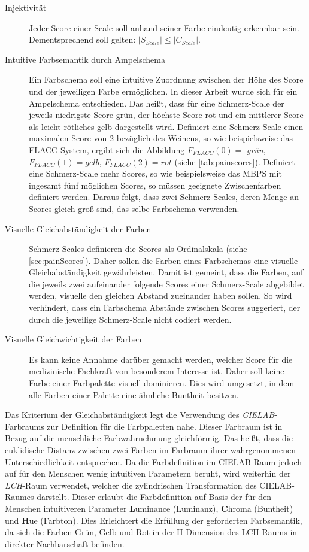 \begin{description}
\item[Injektivität] Jeder Score einer Scale soll anhand seiner Farbe eindeutig erkennbar sein. Dementsprechend soll gelten: $|S_{Scale}| \leq |C_{Scale}|$.
\item[Intuitive Farbsemantik durch Ampelschema] Ein Farbschema soll eine intuitive Zuordnung zwischen der Höhe des Score und der jeweiligen Farbe ermöglichen. In dieser Arbeit wurde sich für ein Ampelschema entschieden. Das heißt, dass für eine Schmerz-Scale der jeweils niedrigste Score \glqq grün\grqq{}, der höchste Score \glqq rot\grqq{} und ein \glqq mittlerer\grqq{} Score als \glqq leicht rötliches gelb\grqq{} dargestellt wird. Definiert eine Schmerz-Scale einen maximalen Score von 2 bezüglich des Weinens, so wie beispielsweise das FLACC-System, ergibt sich die Abbildung $F_{FLACC}(0) = $ \emph{grün}, $F_{FLACC}(1) = gelb$, $F_{FLACC}(2) = rot$ (siehe \autoref{tab:painscores}). Definiert eine Schmerz-Scale mehr Scores, so wie beispielsweise das MBPS mit ingesamt fünf möglichen Scores, so müssen geeignete Zwischenfarben definiert werden. Daraus folgt, dass zwei Schmerz-Scales, deren Menge an Scores gleich groß sind, das selbe Farbschema verwenden.
\item[Visuelle Gleichabständigkeit der Farben] Schmerz-Scales definieren die Scores als Ordinalskala (siehe \autoref{sec:painScores}). Daher sollen die Farben eines Farbschemas eine \glqq visuelle Gleichabständigkeit\grqq{} gewährleisten. Damit ist gemeint, dass die Farben, auf die jeweils zwei aufeinander folgende Scores einer Schmerz-Scale abgebildet werden, visuelle den gleichen Abstand zueinander haben sollen. So wird verhindert, dass ein Farbschema Abstände zwischen Scores suggeriert, der durch die jeweilige Schmerz-Scale nicht codiert werden. 
\item[Visuelle Gleichwichtigkeit der Farben] Es kann keine Annahme darüber gemacht werden, welcher Score für die medizinische Fachkraft von besonderem Interesse ist. Daher soll keine Farbe einer Farbpalette visuell dominieren. Dies wird umgesetzt, in dem alle Farben einer Palette eine ähnliche Buntheit besitzen.\cite{bigman}
\end{description}

Das Kriterium der Gleichabständigkeit legt die Verwendung des \emph{CIELAB}-Farbraums zur Definition für die Farbpaletten nahe. Dieser Farbraum ist in Bezug auf die menschliche Farbwahrnehmung \glqq gleichförmig\grqq. Das heißt, dass die euklidische Distanz zwischen zwei Farben im Farbraum ihrer wahrgenommenen Unterschiedlichkeit entsprechen. Da die Farbdefinition im CIELAB-Raum jedoch auf für den Menschen wenig intuitiven Parametern beruht, wird weiterhin der \emph{LCH}-Raum verwendet, welcher die zylindrischen Transformation des CIELAB-Raumes darstellt. Dieser erlaubt die Farbdefinition auf Basis der für den Menschen intuitiveren Parameter \textbf{L}uminance (Luminanz), \textbf{C}hroma (Buntheit) und \textbf{H}ue (Farbton). Dies Erleichtert die Erfüllung der geforderten Farbsemantik, da sich die Farben Grün, Gelb und Rot in der H-Dimension des LCH-Raums in direkter Nachbarschaft befinden.\cite[S. 2-3]{palettes}\cite{johnstone}

